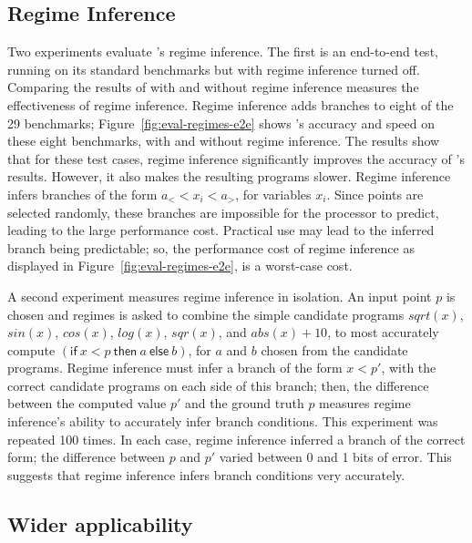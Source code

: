 \documentclass[paper.tex]{subfiles}
\begin{document}
\subsection{Regime Inference} \label{sec:eval-regimes}

Two experiments evaluate \casio's regime inference.  The first is an
end-to-end test, running \casio on its standard benchmarks but with
regime inference turned off.  Comparing the results of \casio with and
without regime inference measures the effectiveness of regime
inference.  Regime inference adds branches to eight of the 29
benchmarks; Figure~\ref{fig:eval-regimes-e2e} shows \casio's accuracy
and speed on these eight benchmarks, with and without regime
inference.  The results show that for these test cases, regime
inference significantly improves the accuracy of \casio's results.
However, it also makes the resulting programs slower.  Regime
inference infers branches of the form $a_< < x_i < a_>$, for variables
$x_i$.  Since points are selected randomly, these branches are
impossible for the processor to predict, leading to the large
performance cost.  Practical use may lead to the inferred branch being
predictable; so, the performance cost of regime inference as displayed
in Figure~\ref{fig:eval-regimes-e2e}, is a worst-case cost.

A second experiment measures regime inference in isolation.  An input
point $p$ is chosen and regimes is asked to combine the simple
candidate programs $sqrt(x)$, $sin(x)$, $cos(x)$, $log(x)$, $sqr(x)$,
and $abs(x) + 10$, to most accurately compute $(\mathsf{if}\:x <
p\:\mathsf{then}\:a\:\mathsf{else}\:b)$, for $a$ and $b$ chosen from
the candidate programs.  Regime inference must infer a branch of the
form $x < p'$, with the correct candidate programs on each side of
this branch; then, the difference between the computed value $p'$ and
the ground truth $p$ measures regime inference's ability to accurately
infer branch conditions.  This experiment was repeated 100 times.  In
each case, regime inference inferred a branch of the correct form; the
difference between $p$ and $p'$ varied between 0 and 1 bits of error.
This suggests that regime inference infers branch conditions very
accurately.

\subsection{Wider applicability}
\end{document}
